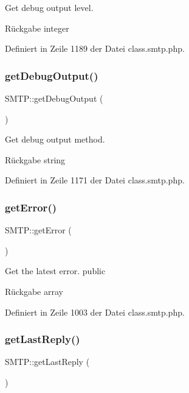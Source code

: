 Get debug output level. \begin{DoxyReturn}{Rückgabe}
integer 
\end{DoxyReturn}


Definiert in Zeile 1189 der Datei class.\+smtp.\+php.

\mbox{\label{class_s_m_t_p_aad1ba3fd91de65a4925981257f058c56}} 
\subsubsection{\texorpdfstring{get\+Debug\+Output()}{getDebugOutput()}}
{\footnotesize\ttfamily S\+M\+T\+P\+::get\+Debug\+Output (\begin{DoxyParamCaption}{ }\end{DoxyParamCaption})}

Get debug output method. \begin{DoxyReturn}{Rückgabe}
string 
\end{DoxyReturn}


Definiert in Zeile 1171 der Datei class.\+smtp.\+php.

\mbox{\label{class_s_m_t_p_ae69932e8666ab3e15c22ea4d9f03909f}} 
\subsubsection{\texorpdfstring{get\+Error()}{getError()}}
{\footnotesize\ttfamily S\+M\+T\+P\+::get\+Error (\begin{DoxyParamCaption}{ }\end{DoxyParamCaption})}

Get the latest error.  public \begin{DoxyReturn}{Rückgabe}
array 
\end{DoxyReturn}


Definiert in Zeile 1003 der Datei class.\+smtp.\+php.

\mbox{\label{class_s_m_t_p_a13044af4796d17fb77b5787c113aab55}} 
\subsubsection{\texorpdfstring{get\+Last\+Reply()}{getLastReply()}}
{\footnotesize\ttfamily S\+M\+T\+P\+::get\+Last\+Reply (\begin{DoxyParamCaption}{ }\end{DoxyParamCaption})}

